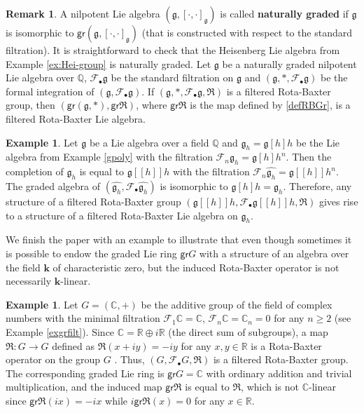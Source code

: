 \documentclass[12pt]{amsart}
\theoremstyle{definition}   %
\newtheorem{ex}[thm]{Example}
\newtheorem{rmk}[thm]{Remark}
\newcommand{\bk}{{\mathbf{k}}}
\newcommand{\gr}{\mathsf{gr}}
\newcommand{\g}{\mathfrak g}
\newcommand{\huaF}{\mathcal{F}}
\newcommand{\frkR}{\mathfrak R}
\begin{document}
\begin{rmk}
A nilpotent Lie algebra $(\g,[\cdot,\cdot]_\g)$ is called {\bf naturally graded} if $\g$ is isomorphic to $\gr(\g,[\cdot,\cdot]_\g)$ (that is constructed with respect to the standard filtration). It is straightforward to check that the Heisenberg Lie algebra from Example \ref{ex:Hei-group} is naturally graded.
Let $\g$ be a naturally graded nilpotent Lie algebra over $\mathbb Q$, $\huaF_{\bullet}\g$ be the standard filtration on $\g$ and $(\g,*,\huaF_{\bullet}\g)$ be the formal integration of $(\g,\huaF_{\bullet}\g)$. If $(\g,*,\huaF_{\bullet}\g,\frkR)$ is a filtered Rota-Baxter group, then $(\gr(\g,*),\gr\frkR)$, where $\gr\frkR$ is the map defined by \eqref{defRBGr}, is a filtered Rota-Baxter Lie algebra.
\end{rmk}



\begin{ex}
Let $\g$ be a Lie algebra over a field $\mathbb Q$ and  $\g_h=\g[h]h$ be the Lie algebra from Example \ref{gpoly} with the filtration $\huaF_n\g_h=\g[h]h^n$. Then the completion of $\g_h$ is equal to $\g[[h]]h$ with the filtration $\huaF_n\widehat{\g_h}=\g[[h]]h^n$. The graded algebra of $(\widehat{\g_h},\huaF_{\bullet}\widehat{\g_h})$ is isomorphic to $\g[h]h=\g_h$. Therefore, any structure of a filtered Rota-Baxter group $(\g[[h]]h,\huaF_\bullet\g[[h]]h,\frkR)$ gives rise to a structure of a filtered Rota-Baxter Lie algebra on $\g_h$.
\end{ex}


   We finish the paper with an example to illustrate that even though sometimes  it is possible to endow the graded Lie ring $\gr G$ with a structure of an algebra over the field $\bk$ of characteristic zero, but the induced Rota-Baxter operator is not necessarily $\bk$-linear.


\begin{ex}
Let $G=(\mathbb C,+)$ be the additive group of the field of complex numbers with the minimal filtration $\huaF_1\mathbb C=\mathbb C$, $\huaF_n\mathbb C=\mathbb C_n=0$ for any $n\geq 2$ (see Example \ref{exgrfilt}). Since $\mathbb C=\mathbb R\oplus i\mathbb R$ (the direct sum of subgroups), a map $\frkR:G\rightarrow G$ defined as $\frkR(x+iy)=-iy$ for any $x,y\in \mathbb R$ is a Rota-Baxter operator on the group $G$ \cite{GLS}. Thus, $(G,\huaF_{\bullet}G,\frkR)$ is a filtered Rota-Baxter group. The corresponding graded Lie ring is  $\gr G=\mathbb C$ with ordinary addition and trivial multiplication, and the induced map $\gr\frkR$ is equal to $\frkR$, which is not $\mathbb C$-linear since $\gr\frkR(ix)=-ix$ while $i\gr\frkR(x)=0$ for any $x\in \mathbb R$.
\end{ex}
\end{document}
